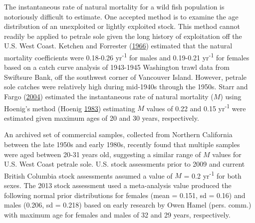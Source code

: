 \documentclass[12pt,]{article}
\begin{document}
The instantaneous rate of natural mortality for a wild fish population
is notoriously difficult to estimate. One accepted method is to examine
the age distribution of an unexploited or lightly exploited stock. This
method cannot readily be applied to petrale sole given the long history
of exploitation off the U.S. West Coast. Ketchen and Forrester
(\protect\hyperlink{ref-ketchen_population_1966}{1966}) estimated that
the natural mortality coefficients were 0.18-0.26 yr\textsuperscript{-1}
for males and 0.19-0.21 yr\textsuperscript{-1} for females based on a
catch curve analysis of 1943-1945 Washington trawl data from Swiftsure
Bank, off the southwest corner of Vancouver Island. However, petrale
sole catches were relatively high during mid-1940s through the 1950s.
Starr and Fargo (\protect\hyperlink{ref-starr_petrale_2004}{2004})
estimated the instantaneous rate of natural mortality (\(M\)) using
Hoenig's method (Hoenig
\protect\hyperlink{ref-hoenig_empirical_1983}{1983}) estimating \(M\)
values of 0.22 and 0.15 yr\textsuperscript{-1} were estimated given
maximum ages of 20 and 30 years, respectively.

An archived set of commercial samples, collected from Northern
California between the late 1950s and early 1980s, recently found that
multiple samples were aged between 20-31 years old, suggesting a similar
range of \(M\) values for U.S. West Coast petrale sole. U.S. stock
assessments prior to 2009 and current British Columbia stock assessments
assumed a value of \(M\) = 0.2 yr\textsuperscript{-1} for both sexes.
The 2013 stock assessment used a meta-analysis value produced the
following normal prior distributions for females (mean = 0.151, sd =
0.16) and males (0.206, sd = 0.218) based on early research by Owen
Hamel (pers. comm.) with maximum age for females and males of 32 and 29
years, respectively.
\end{document}
